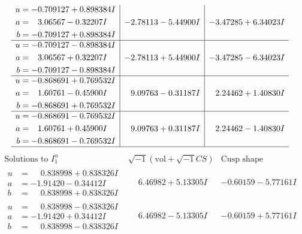 \documentclass[1p]{elsarticle_modified}
\theoremstyle{definition}
\newcommand{\I}{\sqrt{-1}}
\begin{document}
$$\begin{array}{c|c|c}
\begin{aligned}
u &= -0.709127 + 0.898384 I \\
a &= \phantom{-}3.06567 - 0.32207 I \\
b &= -0.709127 + 0.898384 I\end{aligned}
 & -2.78113 - 5.44900 I & -3.47285 + 6.34023 I \\ \hline\begin{aligned}
u &= -0.709127 - 0.898384 I \\
a &= \phantom{-}3.06567 + 0.32207 I \\
b &= -0.709127 - 0.898384 I\end{aligned}
 & -2.78113 + 5.44900 I & -3.47285 - 6.34023 I \\ \hline\begin{aligned}
u &= -0.868691 + 0.769532 I \\
a &= \phantom{-}1.60761 - 0.45900 I \\
b &= -0.868691 + 0.769532 I\end{aligned}
 & \phantom{-}9.09763 - 0.31187 I & \phantom{-}2.24462 + 1.40830 I \\ \hline\begin{aligned}
u &= -0.868691 - 0.769532 I \\
a &= \phantom{-}1.60761 + 0.45900 I \\
b &= -0.868691 - 0.769532 I\end{aligned}
 & \phantom{-}9.09763 + 0.31187 I & \phantom{-}2.24462 - 1.40830 I\\
 \hline 
 \end{array}$$\newpage$$\begin{array}{c|c|c}  
\text{Solutions to }I^u_{1}& \I (\text{vol} + \sqrt{-1}CS) & \text{Cusp shape}\\
 \hline 
\begin{aligned}
u &= \phantom{-}0.838998 + 0.838326 I \\
a &= -1.91420 - 0.34412 I \\
b &= \phantom{-}0.838998 + 0.838326 I\end{aligned}
 & \phantom{-}6.46982 + 5.13305 I & -0.60159 - 5.77161 I \\ \hline\begin{aligned}
u &= \phantom{-}0.838998 - 0.838326 I \\
a &= -1.91420 + 0.34412 I \\
b &= \phantom{-}0.838998 - 0.838326 I\end{aligned}
 & \phantom{-}6.46982 - 5.13305 I & -0.60159 + 5.77161 I \\ \hline\begin{aligned}

\end{aligned}
\end{array}$$
\end{document}
